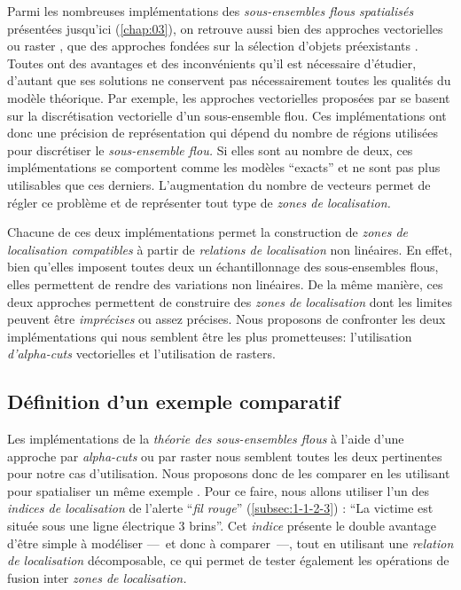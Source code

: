 Parmi les nombreuses implémentations des \emph{sous-ensembles flous
  spatialisés} présentées jusqu'ici (\autoref{chap:03}), on retrouve
aussi bien des approches vectorielles
\autocite{Kanjilal2010,Dilo2007,Zoghlami2016} ou raster
\autocite{Bloch1996}, que des approches fondées sur la sélection
d'objets préexistants \autocite{Duraciova2017}. Toutes ont des
avantages et des inconvénients qu'il est nécessaire d'étudier,
d'autant que ses solutions ne conservent pas nécessairement toutes les
qualités du modèle théorique. Par exemple, les approches vectorielles
proposées par \textcite{Kanjilal2010,Zoghlami2016} se basent sur la
discrétisation vectorielle d'un sous-ensemble flou. Ces
implémentations ont donc une précision de représentation qui dépend du
nombre de régions utilisées pour discrétiser le \emph{sous-ensemble
  flou.} Si elles sont au nombre de deux, ces implémentations se
comportent comme les modèles \enquote{exacts} et ne sont pas plus
utilisables que ces derniers. L'augmentation du nombre de vecteurs
permet de régler ce problème et de représenter tout type de
\emph{zones de localisation.}


Chacune de ces deux implémentations permet la construction de
\emph{zones de localisation compatibles} à partir de \emph{relations
  de localisation} non linéaires. En effet, bien qu'elles imposent
toutes deux un échantillonnage des sous-ensembles flous, elles
permettent de rendre des variations non linéaires. De la même manière,
ces deux approches permettent de construire des \emph{zones de
  localisation} dont les limites peuvent être \emph{imprécises} ou
assez précises. Nous proposons de confronter les deux implémentations
qui nous semblent être les plus prometteuses: l'utilisation
\emph{d'alpha-cuts} vectorielles et l'utilisation de rasters.

\subsection{Définition d'un exemple comparatif}

Les implémentations de la \emph{théorie des sous-ensembles flous} à
l'aide d'une approche par \emph{alpha-cuts} ou par raster nous
semblent toutes les deux pertinentes pour notre cas
d'utilisation. Nous proposons donc de les comparer en les utilisant
pour spatialiser un même exemple \autocite{Bunel2019a}. Pour ce faire,
nous allons utiliser l'un des \emph{indices de localisation} de
l'alerte \enquote{\emph{fil rouge}} (\autoref{subsec:1-1-2-3}) :
\enquote{La victime est située sous une ligne électrique 3 brins}. Cet
\emph{indice} présente le double avantage d'être simple à modéliser
---~et donc à comparer~---, tout en utilisant une \emph{relation de
  localisation} décomposable, ce qui permet de tester également les
opérations de fusion inter \emph{zones de localisation.}

